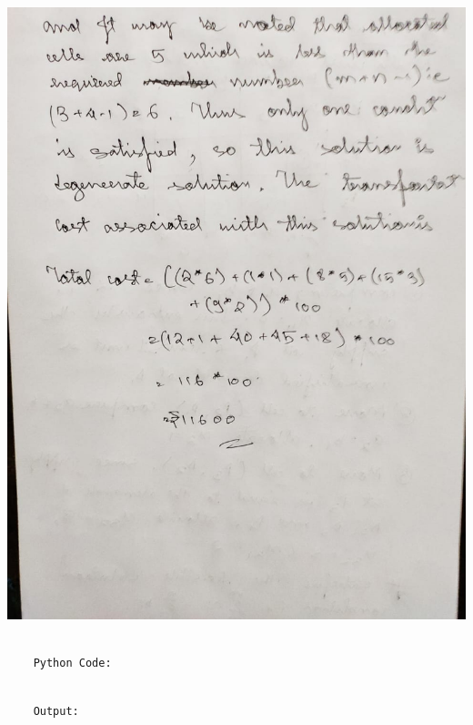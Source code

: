 \documentclass[12pt, letterpaper, twoside]{book}
\begin{document}
\includegraphics[width=\paperwidth, height=\paperheight]{Page6}
\begin{lstlisting}

	Python Code:

\end{lstlisting}

\pagebreak
\begin{lstlisting}

	Output:

\end{lstlisting}
\end{document}
